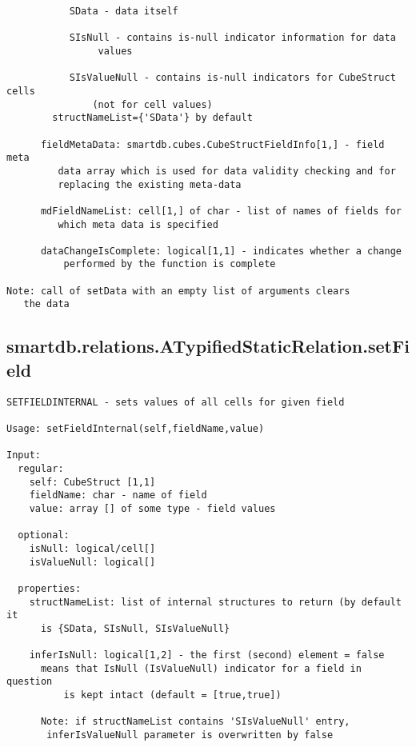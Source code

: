 \begin{verbatim}
           SData - data itself

           SIsNull - contains is-null indicator information for data
                values

           SIsValueNull - contains is-null indicators for CubeStruct cells
               (not for cell values)
        structNameList={'SData'} by default

      fieldMetaData: smartdb.cubes.CubeStructFieldInfo[1,] - field meta
         data array which is used for data validity checking and for
         replacing the existing meta-data

      mdFieldNameList: cell[1,] of char - list of names of fields for
         which meta data is specified

      dataChangeIsComplete: logical[1,1] - indicates whether a change
          performed by the function is complete

Note: call of setData with an empty list of arguments clears
   the data
\end{verbatim}
\subsection{\texorpdfstring{smartdb.relations.ATypifiedStaticRelation.setField}{setField}}\label{method:smartdb.relations.ATypifiedStaticRelation.setField}
\begin{verbatim}
SETFIELDINTERNAL - sets values of all cells for given field

Usage: setFieldInternal(self,fieldName,value)

Input:
  regular:
    self: CubeStruct [1,1]
    fieldName: char - name of field
    value: array [] of some type - field values

  optional:
    isNull: logical/cell[]
    isValueNull: logical[]

  properties:
    structNameList: list of internal structures to return (by default it
      is {SData, SIsNull, SIsValueNull}

    inferIsNull: logical[1,2] - the first (second) element = false
      means that IsNull (IsValueNull) indicator for a field in question
          is kept intact (default = [true,true])

      Note: if structNameList contains 'SIsValueNull' entry,
       inferIsValueNull parameter is overwritten by false
\end{verbatim}
